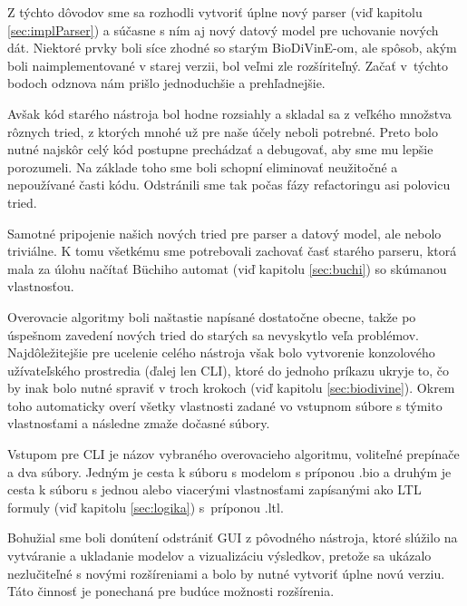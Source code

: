\documentclass[11pt,final,oneside]{fithesis}
\begin{document}
Z t\'ychto d\^ ovodov sme sa rozhodli vytvori\v t \'uplne nov\'y parser (vi\v d kapitolu \ref{sec:implParser}) a s\'u\v casne s n\'im aj nov\'y datov\'y model pre uchovanie nov\'ych d\'at. Niektor\'e
prvky boli s\'ice zhodn\'e so star\'ym BioDiVinE-om, ale sp\^ osob, ak\'ym boli naimplementovan\'e v starej verzii, bol ve\v lmi zle roz\v s\'irite\v ln\'y. 
Za\v ca\v t v~t\'ychto bodoch odznova n\'am pri\v slo jednoduch\v sie a preh\v ladnej\v sie. 

Av\v sak k\'od star\'eho n\'astroja bol hodne rozsiahly a skladal
sa z ve\v lk\'eho mno\v zstva r\^ oznych tried, z ktor\'ych mnoh\'e u\v z pre na\v se \'u\v cely neboli potrebn\'e. Preto bolo nutn\'e najsk\^ or cel\'y k\'od
postupne prech\'adza\v t a debugova\v t, aby sme mu lep\v sie porozumeli. Na z\'aklade toho sme boli schopn\'i eliminova\v t neu\v zito\v cn\'e a 
nepou\v z\'ivan\'e \v casti k\'odu. Odstr\'anili sme tak po\v cas f\'azy refactoringu asi polovicu tried.

Samotn\'e pripojenie na\v sich nov\'ych tried pre parser a datov\'y model, ale nebolo trivi\'alne. K tomu v\v setk\'emu sme 
potrebovali zachova\v t \v cas\v t star\'eho parseru, ktor\'a mala za \'ulohu na\v c\'ita\v t B\"uchiho automat (vi\v d kapitolu \ref{sec:buchi}) so sk\'umanou 
vlastnos\v tou.

Overovacie algoritmy boli na\v stastie nap\'isan\'e dostato\v cne obecne, tak\v ze po \'uspe\v snom zaveden\'i nov\'ych tried do star\'ych sa nevyskytlo ve\v la 
probl\'emov. Najd\^ ole\v zitej\v sie pre ucelenie cel\'eho n\'astroja v\v sak bolo vytvorenie konzolov\'eho u\v z\'ivate\v lsk\'eho prostredia (\v dalej len 
CLI), ktor\'e do jednoho pr\'ikazu ukryje to, \v co by inak bolo nutn\'e spravi\v t v troch krokoch (vi\v d kapitolu \ref{sec:biodivine}). Okrem toho automaticky over\'i v\v setky vlastnosti 
zadan\'e vo vstupnom s\'ubore s t\'ymito vlastnos\v tami a n\'asledne zma\v ze do\v casn\'e s\'ubory. 

Vstupom pre CLI je n\'azov vybran\'eho overovacieho algoritmu, volite\v ln\'e prep\'ina\v ce a dva s\'ubory. Jedn\'ym 
je cesta k s\'uboru s modelom s pr\'iponou .bio a druh\'ym je cesta k s\'uboru s jednou alebo viacer\'ymi vlastnos\v tami zap\'isan\'ymi ako LTL formuly 
(vi\v d kapitolu \ref{sec:logika}) s~pr\'iponou .ltl. 

Bohu\v zial sme boli don\'uten\'i odstr\'ani\v t GUI z p\^ ovodn\'eho n\'astroja, ktor\'e sl\'u\v zilo na vytv\'aranie a ukladanie modelov a vizualiz\'aciu v\'ysledkov, 
preto\v ze sa uk\'azalo nezlu\v cite\v ln\'e s nov\'ymi roz\v s\'ireniami a bolo by  nutn\'e vytvori\v t \'uplne nov\'u verziu. T\'ato \v cinnos\v t je 
ponechan\'a pre bud\'uce mo\v znosti roz\v s\'irenia.
\end{document}
